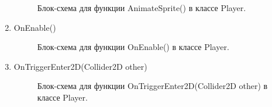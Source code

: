\documentclass[14pt, oneside]{altsu-report}
\begin{document}
\begin{enumerate}
\begin{figure}[H]
\caption{Блок-схема для функции AnimateSprite() в классе Player.}
\end{figure}


\item OnEnable() 

\begin{figure}[H]
\caption{Блок-схема для функции OnEnable() в классе Player.}
\end{figure}


\item OnTriggerEnter2D(Collider2D other) 

\begin{figure}[H]
\caption{Блок-схема для функции OnTriggerEnter2D(Collider2D other) в классе Player.}
\end{figure}


\end{enumerate}
\end{document}
